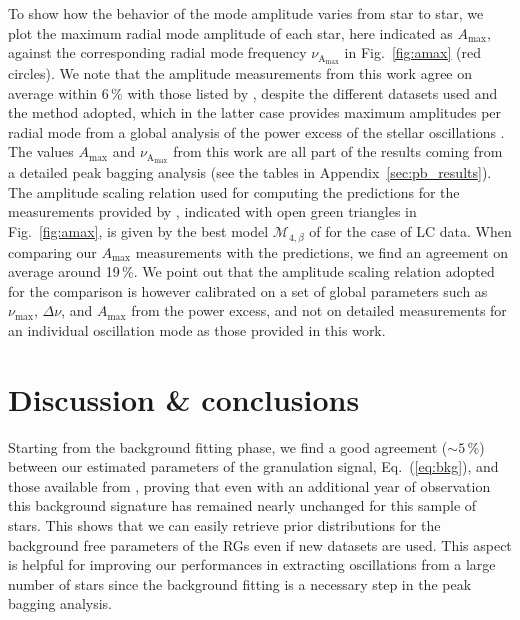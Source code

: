 \documentclass[structabstract]{aa}
\newcommand{\Dnu}{\Delta \nu}
\newcommand{\numax}{\nu_\mathrm{max}}
\begin{document}
To show how the behavior of the mode amplitude varies from star to star, we plot the maximum radial mode amplitude of each star, here indicated as $A_\mathrm{max}$, against the corresponding radial mode frequency $\nu_\mathrm{A_\mathrm{max}}$ in Fig.~\ref{fig:amax} (red circles). We note that the amplitude measurements from this work agree on average within 6\,\% with those listed by \cite{Huber11}, despite the different datasets used and the method adopted, which in the latter case provides maximum amplitudes per radial mode from a global analysis of the power excess of the stellar oscillations \citep[see][and references therein for more details]{Huber11}. The values $A_\mathrm{max}$ and $\nu_\mathrm{A_\mathrm{max}}$ from this work are all part of the results coming from a detailed peak bagging analysis (see the tables in Appendix~\ref{sec:pb_results}). The amplitude scaling relation used for computing the predictions for the measurements provided by \cite{Huber11}, indicated with open green triangles in Fig.~\ref{fig:amax}, is given by the best model $\mathcal{M}_{4,\beta}$ of \cite{Corsaro13} for the case of LC data. When comparing our $A_\mathrm{max}$ measurements with the predictions, we find an agreement on average around 19\,\%. We point out that the amplitude scaling relation adopted for the comparison is however calibrated on a set of global parameters such as $\numax$, $\Dnu$, and $A_\mathrm{max}$ from the power excess, and not on detailed measurements for an individual oscillation mode as those provided in this work.

\section{Discussion \& conclusions}
\label{sec:discussion}
Starting from the background fitting phase, we find a good agreement ($\sim 5$\,\%) between our estimated parameters of the granulation signal, Eq.~(\ref{eq:bkg}), and those available from \cite{Kallinger14}, proving that even with an additional year of observation this background signature has remained nearly unchanged for this sample of stars. This shows that we can easily retrieve prior distributions for the background free parameters of the RGs even if new datasets are used. This aspect is helpful for improving our performances in extracting oscillations from a large number of stars since the background fitting is a necessary step in the peak bagging analysis.
\end{document}
